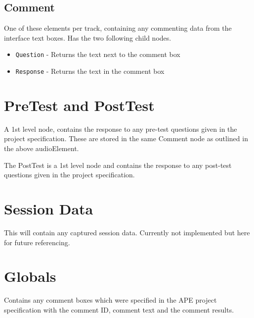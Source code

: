 \documentclass{article}
\begin{document}
\subsection{Comment}
One of these elements per track, containing any commenting data from the interface text boxes. Has the two following child nodes.
\begin{itemize}
\item \texttt{Question} - Returns the text next to the comment box
\item \texttt{Response} - Returns the text in the comment box
\end{itemize}

\section{PreTest and PostTest}
A 1st level node, contains the response to any pre-test questions given in the project specification. These are stored in the same Comment node as outlined in the above audioElement.

The PostTest is a 1st level node and contains the response to any post-test questions given in the project specification.

\section{Session Data}
This will contain any captured session data. Currently not implemented but here for future referencing.

\section{Globals}
Contains any comment boxes which were specified in the APE project specification with the comment ID, comment text and the comment results.
\end{document}
